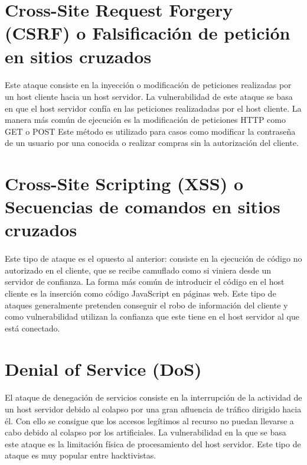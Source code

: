 \documentclass[10pt, a4paper,spanish]{article}
\begin{document}
    \section{Cross-Site Request Forgery (CSRF) o Falsificación de petición en sitios cruzados}
        \paragraph{}
		Este ataque consiste en la inyección o modificación de peticiones realizadas por un host cliente hacia un host servidor. La vulnerabilidad de este ataque se basa en que el host servidor confía en las peticiones realizadadas por el host cliente. La manera más común de ejecución es la modificación de peticiones HTTP como GET o POST Este método es utilizado para casos como modificar la contraseña de un usuario por una conocida o realizar compras sin la autorización del cliente.


    \section{Cross-Site Scripting (XSS) o Secuencias de comandos en sitios cruzados}
        \paragraph{}
		Este tipo de ataque es el opuesto al anterior: consiste en la ejecución de código no autorizado en el cliente, que se recibe camuflado como si viniera desde un servidor de confianza. La forma más común de introducir el código en el host cliente es la inserción como código JavaScript en páginas web. Este tipo de ataques generalmente pretenden conseguir el robo de información del cliente y como vulnerabilidad utilizan la confianza que este tiene en el host servidor al que está conectado.


    \section{Denial of Service (DoS)}
        \paragraph{}
		El ataque de denegación de servicios consiste en la interrupción de la actividad de un host servidor debido al colapso por una gran afluencia de tráfico dirigido hacia él. Con ello se consigue que los accesos legítimos al recurso no puedan llevarse a cabo debido al colapso por los artificiales. La vulnerabilidad en la que se basa este ataque es la limitación física de procesamiento del host servidor. Este tipo de ataque es muy popular entre hacktivistas.
\end{document}
